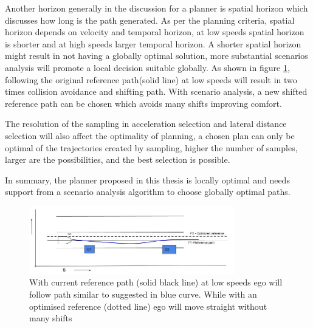 Another horizon generally in the discussion for a planner is spatial horizon which discusses how long is the path generated. As per the planning criteria, spatial horizon depends on velocity and temporal horizon, at low speeds spatial horizon is shorter and at high speeds larger temporal horizon. A shorter spatial horizon might result in not having a globally optimal solution, more substantial scenarios analysis will promote a local decision suitable globally. As shown in figure \ref{optimized_reference}, following the original reference path(solid line) at low speeds will result in two times collision avoidance and shifting path. With scenario analysis, a new shifted reference path can be chosen which avoids many shifts improving comfort.

The resolution of the sampling in acceleration selection and lateral distance selection will also affect the optimality of planning, a chosen plan can only be optimal of the trajectories created by sampling, higher the number of samples, larger are the possibilities, and the best selection is possible. 

In summary, the planner proposed in this thesis is locally optimal and needs support from a scenario analysis algorithm to choose globally optimal paths. 
 
 \begin{figure}[h]
    \centering
    \includegraphics[width=0.8\textwidth]{Images/evaluation/optimized_reference.jpg}
    \caption{With current reference path (solid black line) at low speeds ego will follow path similar to suggested in blue curve. While with an optimised reference (dotted line) ego will move straight without many shifts}
    \label{optimized_reference}
\end{figure}

